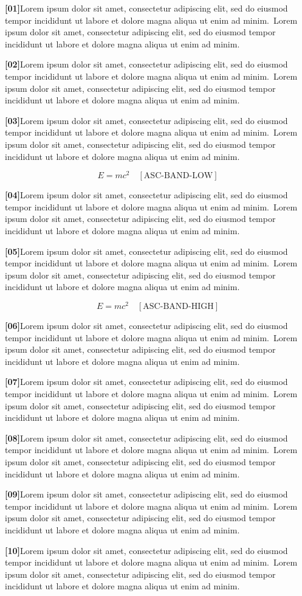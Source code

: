 \documentclass[twocolumn]{article}
\newcommand\Body{Lorem ipsum dolor sit amet, consectetur adipiscing elit, sed do
eiusmod tempor incididunt ut labore et dolore magna aliqua ut enim ad minim.}
\newcommand\Par[1]{\par\noindent\textbf{[#1]}\space\Body\ \Body\par\medskip}
\begin{document}
\Par{01}\Par{02}\Par{03}
\begin{wideband}[120pt]\[ E=mc^2 \quad[\text{ASC-BAND-LOW}] \]\end{wideband}
\Par{04}\Par{05}
\begin{wideband}[300pt]\[ E=mc^2 \quad[\text{ASC-BAND-HIGH}] \]\end{wideband}
\Par{06}\Par{07}\Par{08}\Par{09}\Par{10}
\end{document}
